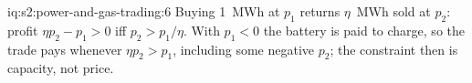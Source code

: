 \begin{solution}{iq:s2:power-and-gas-trading:6}
Buying 1~MWh at $p_1$ returns $\eta$~MWh sold at $p_2$: profit $\eta p_2 - p_1 > 0$ iff $p_2 > p_1/\eta$. With $p_1 < 0$ the battery is paid to
charge, so the trade pays whenever $\eta p_2 > p_1$, including some negative $p_2$; the constraint then is capacity, not price.
\end{solution}

